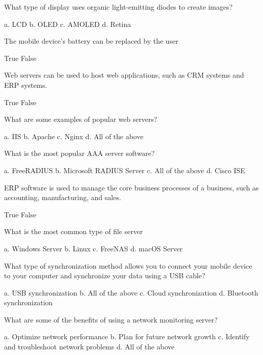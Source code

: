 \documentclass{exam}
\begin{document}
\begin{questions}
\question What type of display uses organic light-emitting diodes to create images?
\begin{checkboxes}
\choice a. LCD
\CorrectChoice b. OLED
\choice c. AMOLED
\choice d. Retina
\end{checkboxes}

\question The mobile device's battery can be replaced by the user
\begin{checkboxes}
\CorrectChoice True
\choice False
\end{checkboxes}

\question Web servers can be used to host web applications, such as CRM systems and ERP systems.
\begin{checkboxes}
\CorrectChoice True
\choice False
\end{checkboxes}

\question What are some examples of popular web servers?
\begin{checkboxes}
\choice a. IIS
\choice b. Apache
\choice c. Nginx
\CorrectChoice d. All of the above
\end{checkboxes}

\question What is the most popular AAA server software?
\begin{checkboxes}
\choice a. FreeRADIUS
\choice b. Microsoft RADIUS Server
\choice c. All of the above
\CorrectChoice d. Cisco ISE
\end{checkboxes}

\question ERP software is used to manage the core business processes of a business, such as accounting, manufacturing, and sales.
\begin{checkboxes}
\CorrectChoice True
\choice False
\end{checkboxes}

\question What is the most common type of file server
\begin{checkboxes}
\CorrectChoice a. Windows Server
\choice b. Linux
\choice c. FreeNAS
\choice d. macOS Server
\end{checkboxes}

\question What type of synchronization method allows you to connect your mobile device to your computer and synchronize your data using a USB cable?
\begin{checkboxes}
\CorrectChoice a. USB synchronization
\choice b. All of the above
\choice c. Cloud synchronization
\choice d. Bluetooth synchronization
\end{checkboxes}

\question What are some of the benefits of using a network monitoring server?
\begin{checkboxes}
\choice a. Optimize network performance
\choice b. Plan for future network growth
\choice c. Identify and troubleshoot network problems
\CorrectChoice d. All of the above
\end{checkboxes}


\end{questions}
\end{document}
